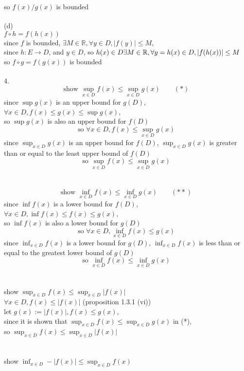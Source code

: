 \documentclass[12pt, border = 4pt, multi]{article} %
\begin{document}
so $f(x) / g(x)$ is bounded\\
\\
(d)\\
$f \circ h = f(h(x))$\\
since $f$ is bounded, $\exists M \in \mathbb{R}, \forall y \in D, |f(y)| \leq M$,\\
since $h: E \rightarrow D$, and $y \in D$, so $h(x) \in D\\
\exists M \in \mathbb{R}, \forall y = h(x) \in D, |f(h(x))| \leq M$\\
so $f \circ g = f(g(x))$ is bounded\\
\\
4.\\
\[\text{show }\sup_{x \in D} f(x) \leq \sup_{x \in D} g(x) \qquad (*)\]
since $\sup g(x)$ is an upper bound for $g(D)$, $\forall x \in D, f(x) \leq g(x) \leq \sup g(x)$,\\
so $\sup g(x)$ is also an upper bound for $f(D)$
\[\text{so }\forall x \in D, f(x) \leq \sup_{x \in D} g(x)\]
since $\sup_{x \in D} g(x)$ is an upper bound for $f(D)$, $\sup_{x \in D} g(x)$ is greater than or equal to the least upper bound of $f(D)$
\[\text{so }\sup_{x \in D} f(x) \leq \sup_{x \in D} g(x)\]
\\
\\
\[\text{show }\inf_{x \in D} f(x) \leq \inf_{x \in D} g(x) \qquad (**)\]
since $\inf f(x)$ is a lower bound for $f(D)$, $\forall x \in D, \inf f(x) \leq f(x) \leq g(x)$,\\
so $\inf f(x)$ is also a lower bound for $g(D)$
\[\text{so }\forall x \in D, \inf_{x \in D} f(x) \leq g(x)\]
since $\inf_{x \in D} f(x)$ is a lower bound for $g(D)$, $\inf_{x \in D} f(x)$ is less than or equal to the greatest lower bound of $g(D)$
\[\text{so }\inf_{x \in D} f(x) \leq \inf_{x \in D} g(x)\]
\\
\\
show $\sup_{x \in D} f(x) \leq \sup_{x \in D} |f(x)|$\\
$\forall x \in D, f(x) \leq |f(x)|$ \qquad (proposition 1.3.1 (vi))\\
let $g(x) := |f(x)|, f(x) \leq g(x)$,\\
since it is shown that $\sup_{x \in D} f(x) \leq \sup_{x \in D} g(x)$ in (*),\\
so $\sup_{x \in D} f(x) \leq \sup_{x \in D} |f(x)|$\\
\\
\\
show $\inf_{x \in D} -|f(x)| \leq \sup_{x \in D} f(x)$\\
\end{document}
